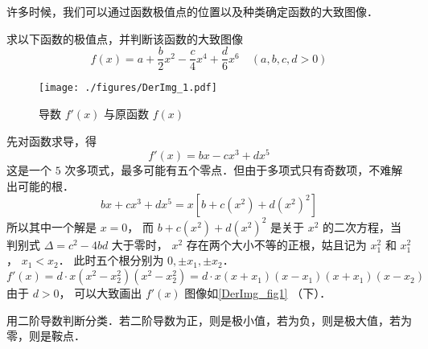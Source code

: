 
许多时候，我们可以通过函数极值点的位置以及种类确定函数的大致图像．

\begin{example}{}
求以下函数的极值点，并判断该函数的大致图像
\begin{equation}
f(x) = a + \frac{b}{2} x^2 - \frac{c}{4} x^4 + \frac{d}{6} x^6 \quad (a,b,c,d >0)
\end{equation}

\begin{figure}[ht]
\centering
\texttt{[image: ./figures/DerImg\_1.pdf]}
\caption{导数 $f'(x)$ 与原函数 $f(x)$}\label{DerImg_fig1}
\end{figure}

先对函数求导，得
\begin{equation}
f'(x) = bx - c x^3 + d x^5
\end{equation}
这是一个 $5$ 次多项式，最多可能有五个零点．但由于多项式只有奇数项，不难解出可能的根．
 \begin{equation}
bx + c x^3 + d x^5 = x[b + c(x^2) + d(x^2)^2 ]
\end{equation}
所以其中一个解是 $x = 0$， 而 $b + c(x^2) + d (x^2)^2$ 是关于 $x^2$ 的二次方程，当判别式 $\Delta  = c^2 - 4bd$ 大于零时， $x^2$ 存在两个大小不等的正根，姑且记为 $x_1^2$ 和 $x_1^2$， $x_1 < x_2$． 
此时五个根分别为 $0, \pm x_1, \pm x_2$． 
\begin{equation}
f'(x) = d \cdot x (x^2 - x_2^2) (x^2 - x_2^2) = d \cdot x (x + x_1)(x - x_1)(x + x_1)(x - x_2)
\end{equation} 
由于 $d > 0$， 可以大致画出 $f'(x)$ 图像如\autoref{DerImg_fig1} （下）．

用二阶导数判断分类．若二阶导数为正，则是极小值，若为负，则是极大值，若为零，则是鞍点．
\end{example}
